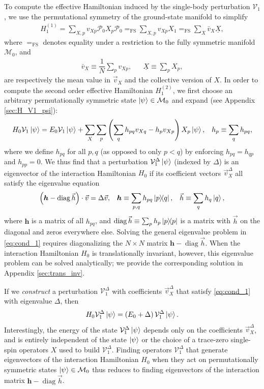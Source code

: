 \documentclass[nofootinbib,notitlepage,11pt]{revtex4-2}
\newcommand{\f}[2]{\dfrac{#1}{#2}} %
\newcommand{\p}[1]{\left(#1\right)} %
\renewcommand{\c}{\cdot} %
\newcommand{\m}{\bm} %
\renewcommand{\v}{\vec} %
\newcommand{\1}{\mathds{1}}
\newcommand{\M}{\mathcal{M}}
\renewcommand{\P}{\mathcal{P}}
\newcommand{\V}{\mathcal{V}}
\newcommand{\EQFS}{=_{\text{FS}}}
\newcommand{\col}{\underline}
\DeclareMathOperator{\diag}{diag}
\begin{document}
To compute the effective Hamiltonian induced by the single-body
perturbation $\V_1$, we use the permutational symmetry of the
ground-state manifold to simplify
\begin{align}
  H_1^{(1)} = \sum_{X,p} v_{Xp} \P_0 X_p \P_0
  \EQFS \sum_{X,p} v_{Xp} X_1
  \EQFS \sum_X \bar v_X \col{X},
  \label{eq:H_1_1}
\end{align}
where $\EQFS$ denotes equality under a restriction to the fully
symmetric manifold $\M_0$, and
\begin{align}
  \bar v_X \equiv \f1N \sum_p v_{Xp},
  &&
  \col{X} \equiv \sum_p X_p,
\end{align}
are respectively the mean value in $\v v_X$ and the collective version
of $X$.  In order to compute the second order effective Hamiltonian
$H_1^{(2)}$, we first choose an arbitrary permutationally symmetric
state $\ket\psi\in\M_0$ and expand (see Appendix \ref{sec:H_V1_psi}):
\begin{align}
  H_0 \V_1 \ket\psi
  = E_0 \V_1 \ket\psi
  + \sum_X \sum_p \p{\sum_q h_{pq} v_{Xq} - h_p v_{Xp}} X_p
  \ket\psi,
  &&
  h_p \equiv \sum_q h_{pq},
  \label{eq:H_V1_psi}
\end{align}
where we define $h_{pq}$ for all $p,q$ (as opposed to only $p<q$) by
enforcing $h_{pq}=h_{qp}$ and $h_{pp}=0$.  We thus find that a
perturbation $\V_1^\Delta\ket\psi$ (indexed by $\Delta$) is an
eigenvector of the interaction Hamiltonian $H_0$ if its coefficient
vectors $\v v_X^\Delta$ all satisfy the eigenvalue equation
\begin{align}
  \p{\m h - \diag\v h}\c\v v = \Delta \v v,
  &&
  \m h \equiv \sum_{p,q} h_{pq} \op{p}{q},
  &&
  \v h \equiv \sum_q h_q \ket{q},
  \label{eq:cond_1}
\end{align}
where $\m h$ is a matrix of all $h_{pq}$, and
$\diag\v h\equiv\sum_p h_p \op{p}$ is a matrix with $\v h$ on the
diagonal and zeros everywhere else.  Solving the general eigenvalue
problem in \eqref{eq:cond_1} requires diagonalizing the $N\times N$
matrix $\m h-\diag\v h$.  When the interaction Hamiltonian $H_0$ is
translationally invariant, however, this eigenvalue problem can be
solved analytically; we provide the corresponding solution in Appendix
\ref{sec:trans_inv}.

If we {\it construct} a perturbation $\V_1^\Delta$ with coefficients
$\v v_X^\Delta$ that satisfy \eqref{eq:cond_1} with eigenvalue
$\Delta$, then
\begin{align}
  H_0 \V_1^\Delta \ket\psi = \p{E_0 + \Delta} \V_1^\Delta \ket\psi.
\end{align}
Interestingly, the energy of the state $\V_1^\Delta\ket\psi$ depends
only on the coefficients $\v v_X^\Delta$, and is entirely independent
of the state $\ket\psi$ or the choice of a trace-zero single-spin
operators $X$ used to build $\V_1^\Delta$.  Finding operators
$\V_1^\Delta$ that generate eigenvectors of the interaction
Hamiltonian $H_0$ when they act on permutationally symmetric states
$\ket\psi\in\M_0$ thus reduces to finding eigenvectors of the
interaction matrix $\m h-\diag\v h$.
\end{document}
